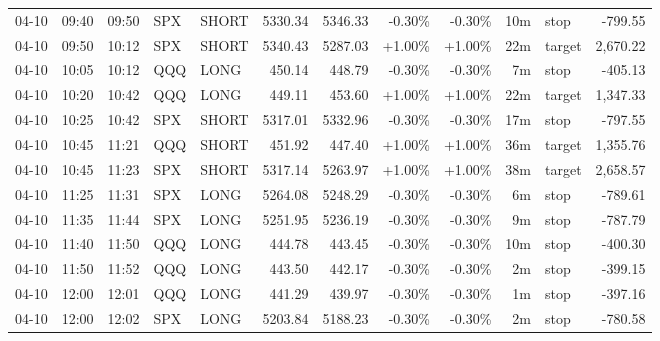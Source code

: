 \documentclass[11pt,a4paper,twoside]{article}
\begin{document}
\begin{center}
\begin{longtable}{>{\color{txtmain}}l l l l l r r r r r >{\color{txtmain}}l r}
04-10 & 09:40 & 09:50 & SPX & SHORT & 5330.34 & 5346.33 & \textcolor{lossred}{-0.30\%} & \textcolor{lossred}{-0.30\%} & 10m & stop & \textcolor{lossred}{-799.55} \\
04-10 & 09:50 & 10:12 & SPX & SHORT & 5340.43 & 5287.03 & \textcolor{wingreen}{+1.00\%} & \textcolor{wingreen}{+1.00\%} & 22m & target & \textcolor{wingreen}{2,670.22} \\
04-10 & 10:05 & 10:12 & QQQ & LONG & 450.14 & 448.79 & \textcolor{lossred}{-0.30\%} & \textcolor{lossred}{-0.30\%} & 7m & stop & \textcolor{lossred}{-405.13} \\
04-10 & 10:20 & 10:42 & QQQ & LONG & 449.11 & 453.60 & \textcolor{wingreen}{+1.00\%} & \textcolor{wingreen}{+1.00\%} & 22m & target & \textcolor{wingreen}{1,347.33} \\
04-10 & 10:25 & 10:42 & SPX & SHORT & 5317.01 & 5332.96 & \textcolor{lossred}{-0.30\%} & \textcolor{lossred}{-0.30\%} & 17m & stop & \textcolor{lossred}{-797.55} \\
04-10 & 10:45 & 11:21 & QQQ & SHORT & 451.92 & 447.40 & \textcolor{wingreen}{+1.00\%} & \textcolor{wingreen}{+1.00\%} & 36m & target & \textcolor{wingreen}{1,355.76} \\
04-10 & 10:45 & 11:23 & SPX & SHORT & 5317.14 & 5263.97 & \textcolor{wingreen}{+1.00\%} & \textcolor{wingreen}{+1.00\%} & 38m & target & \textcolor{wingreen}{2,658.57} \\
04-10 & 11:25 & 11:31 & SPX & LONG & 5264.08 & 5248.29 & \textcolor{lossred}{-0.30\%} & \textcolor{lossred}{-0.30\%} & 6m & stop & \textcolor{lossred}{-789.61} \\
04-10 & 11:35 & 11:44 & SPX & LONG & 5251.95 & 5236.19 & \textcolor{lossred}{-0.30\%} & \textcolor{lossred}{-0.30\%} & 9m & stop & \textcolor{lossred}{-787.79} \\
04-10 & 11:40 & 11:50 & QQQ & LONG & 444.78 & 443.45 & \textcolor{lossred}{-0.30\%} & \textcolor{lossred}{-0.30\%} & 10m & stop & \textcolor{lossred}{-400.30} \\
04-10 & 11:50 & 11:52 & QQQ & LONG & 443.50 & 442.17 & \textcolor{lossred}{-0.30\%} & \textcolor{lossred}{-0.30\%} & 2m & stop & \textcolor{lossred}{-399.15} \\
04-10 & 12:00 & 12:01 & QQQ & LONG & 441.29 & 439.97 & \textcolor{lossred}{-0.30\%} & \textcolor{lossred}{-0.30\%} & 1m & stop & \textcolor{lossred}{-397.16} \\
04-10 & 12:00 & 12:02 & SPX & LONG & 5203.84 & 5188.23 & \textcolor{lossred}{-0.30\%} & \textcolor{lossred}{-0.30\%} & 2m & stop & \textcolor{lossred}{-780.58} \\

\end{longtable}
\end{center}
\end{document}
